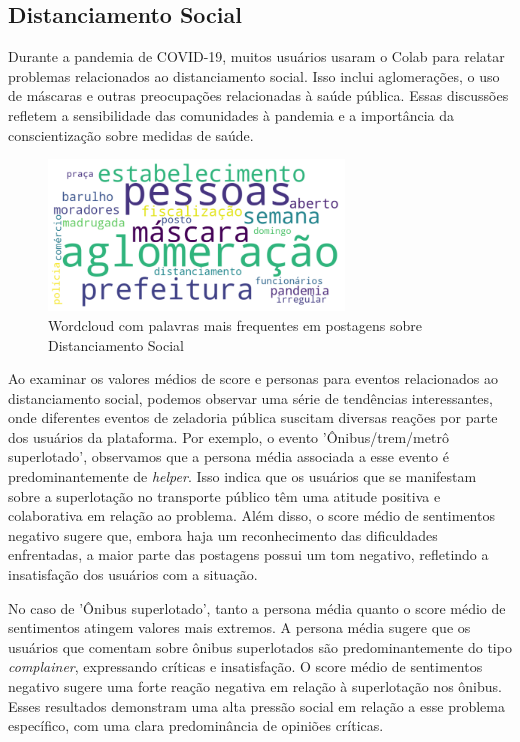 \subsection{Distanciamento Social}

Durante a pandemia de COVID-19, muitos usuários usaram o Colab para relatar problemas relacionados ao distanciamento social. Isso inclui aglomerações, o uso de máscaras e outras preocupações relacionadas à saúde pública. Essas discussões refletem a sensibilidade das comunidades à pandemia e a importância da conscientização sobre medidas de saúde.

\begin{figure}[htb]
	\centering
	\includegraphics[width=0.7\textwidth]{images/wordcloud_social_distancing.png}
	\caption{Wordcloud com palavras mais frequentes em postagens sobre Distanciamento Social}
	\label{fig:wordcloud_social_distancing}
\end{figure}

Ao examinar os valores médios de score e personas para eventos relacionados ao distanciamento social, podemos observar uma série de tendências interessantes, onde diferentes eventos de zeladoria pública suscitam diversas reações por parte dos usuários da plataforma. Por exemplo, o evento 'Ônibus/trem/metrô superlotado', observamos que a persona média associada a esse evento é predominantemente de \textit{helper}. Isso indica que os usuários que se manifestam sobre a superlotação no transporte público têm uma atitude positiva e colaborativa em relação ao problema. Além disso, o score médio de sentimentos negativo sugere que, embora haja um reconhecimento das dificuldades enfrentadas, a maior parte das postagens possui um tom negativo, refletindo a insatisfação dos usuários com a situação.

No caso de 'Ônibus superlotado', tanto a persona média quanto o score médio de sentimentos atingem valores mais extremos. A persona média sugere que os usuários que comentam sobre ônibus superlotados são predominantemente do tipo \textit{complainer}, expressando críticas e insatisfação. O score médio de sentimentos negativo sugere uma forte reação negativa em relação à superlotação nos ônibus. Esses resultados demonstram uma alta pressão social em relação a esse problema específico, com uma clara predominância de opiniões críticas.

